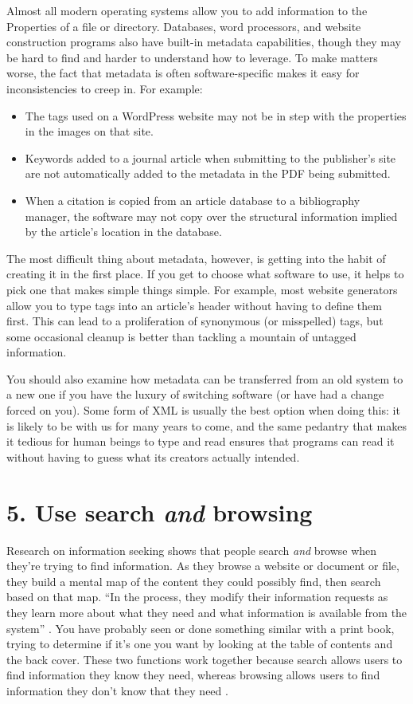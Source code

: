 \documentclass[10pt,letterpaper]{article}
\newcommand{\rulemajor}[1]{\section*{#1}}
\begin{document}
Almost all modern operating systems allow you to add information to the
Properties of a file or directory. Databases, word processors, and website
construction programs also have built-in metadata capabilities, though they may
be hard to find and harder to understand how to leverage. To make matters worse,
the fact that metadata is often software-specific makes it easy for
inconsistencies to creep in. For example:

\begin{itemize}

\item
  The tags used on a WordPress website may not be in step with the properties in
  the images on that site.

\item
  Keywords added to a journal article when submitting to the publisher's site
  are not automatically added to the metadata in the PDF being submitted.

\item
  When a citation is copied from an article database to a bibliography manager,
  the software may not copy over the structural information implied by the
  article's location in the database.

\end{itemize}

The most difficult thing about metadata, however, is getting into the habit of
creating it in the first place. If you get to choose what software to use, it
helps to pick one that makes simple things simple. For example, most website
generators allow you to type tags into an article's header without having to
define them first. This can lead to a proliferation of synonymous (or
misspelled) tags, but some occasional cleanup is better than tackling a mountain
of untagged information.

You should also examine how metadata can be transferred from an old system to a
new one if you have the luxury of switching software (or have had a change
forced on you). Some form of XML is usually the best option when doing this: it
is likely to be with us for many years to come, and the same pedantry that makes
it tedious for human beings to type and read ensures that programs can read it
without having to guess what its creators actually intended.

\rulemajor{5. Use search \emph{and} browsing}

Research on information seeking shows that people search \emph{and} browse when
they're trying to find information. As they browse a website or document or
file, they build a mental map of the content they could possibly find, then
search based on that map. ``In the process, they modify their information
requests as they learn more about what they need and what information is
available from the system'' \cite{Rosenfeld2015}. You have probably seen or done
something similar with a print book, trying to determine if it's one you want by
looking at the table of contents and the back cover. These two functions work
together because search allows users to find information they know they need,
whereas browsing allows users to find information they don't know that they need
\cite{Bates2002}.
\end{document}
